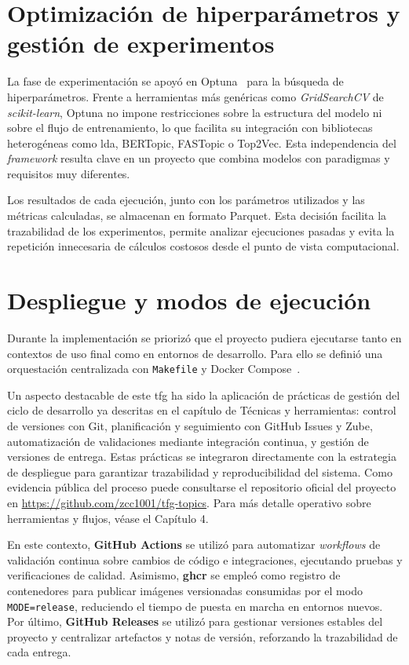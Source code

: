 \section{Optimización de hiperparámetros y gestión de experimentos}

La fase de experimentación se apoyó en
Optuna~\cite{OptunaHyperparameterOptimization} para la búsqueda de
hiperparámetros. Frente a herramientas más genéricas como \textit{GridSearchCV}
de \textit{scikit-learn}, Optuna no impone restricciones sobre la estructura
del modelo ni sobre el flujo de entrenamiento, lo que facilita su integración
con bibliotecas heterogéneas como \acrshort{lda}, BERTopic, FASTopic o Top2Vec.
Esta independencia del \textit{framework} resulta clave en un proyecto que
combina modelos con paradigmas y requisitos muy diferentes.

Los resultados de cada ejecución, junto con los parámetros utilizados y las
métricas calculadas, se almacenan en formato Parquet. Esta decisión facilita la
trazabilidad de los experimentos, permite analizar ejecuciones pasadas y evita
la repetición innecesaria de cálculos costosos desde el punto de vista
computacional.

\section{Despliegue y modos de ejecución}

Durante la implementación se priorizó que el proyecto pudiera ejecutarse tanto
en contextos de uso final como en entornos de desarrollo. Para ello se definió
una orquestación centralizada con \texttt{Makefile} y Docker
Compose~\cite{DockerManuals}.

Un aspecto destacable de este \acrshort{tfg} ha sido la aplicación de prácticas
de gestión del ciclo de desarrollo ya descritas en el capítulo de Técnicas y
herramientas: control de versiones con Git, planificación y seguimiento con
GitHub Issues y Zube, automatización de validaciones mediante integración
continua, y gestión de versiones de entrega. Estas prácticas se integraron
directamente con la estrategia de despliegue para garantizar trazabilidad y
reproducibilidad del sistema. Como evidencia pública del proceso puede
consultarse el repositorio oficial del proyecto en
\url{https://github.com/zcc1001/tfg-topics}. Para más detalle operativo sobre
herramientas y flujos, véase el Capítulo 4.

En este contexto, \textbf{GitHub Actions} se utilizó para automatizar
\textit{workflows} de validación continua sobre cambios de código e
integraciones, ejecutando pruebas y verificaciones de calidad. Asimismo,
\textbf{\acrshort{ghcr}} se empleó como registro de contenedores para publicar
imágenes versionadas consumidas por el modo \texttt{MODE=release}, reduciendo
el tiempo de puesta en marcha en entornos nuevos. Por último, \textbf{GitHub
      Releases} se utilizó para gestionar versiones estables del proyecto y
centralizar artefactos y notas de versión, reforzando la trazabilidad de cada
entrega.

